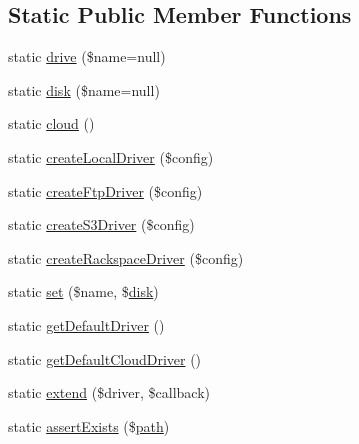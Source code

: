 \subsection*{Static Public Member Functions}
\begin{DoxyCompactItemize}
\item 
static \mbox{\hyperlink{class_illuminate_1_1_support_1_1_facades_1_1_storage_a261ec68d5325c6d133eac820d73a5a0d}{drive}} (\$name=null)
\item 
static \mbox{\hyperlink{class_illuminate_1_1_support_1_1_facades_1_1_storage_a6ae22fe200905058deeb0058c2a43d4d}{disk}} (\$name=null)
\item 
static \mbox{\hyperlink{class_illuminate_1_1_support_1_1_facades_1_1_storage_ae9be6c1f8f5a281ec97fc1ab69039ef6}{cloud}} ()
\item 
static \mbox{\hyperlink{class_illuminate_1_1_support_1_1_facades_1_1_storage_a496f26566f93d1f4072f222e0041a8a0}{create\+Local\+Driver}} (\$config)
\item 
static \mbox{\hyperlink{class_illuminate_1_1_support_1_1_facades_1_1_storage_aa08b823e86c1f3c25c78c337955cdbd7}{create\+Ftp\+Driver}} (\$config)
\item 
static \mbox{\hyperlink{class_illuminate_1_1_support_1_1_facades_1_1_storage_a1e32f6e2813cb377e6dee24d4d6cdb28}{create\+S3\+Driver}} (\$config)
\item 
static \mbox{\hyperlink{class_illuminate_1_1_support_1_1_facades_1_1_storage_ac64c2690d277dcc67da7f86181f2caae}{create\+Rackspace\+Driver}} (\$config)
\item 
static \mbox{\hyperlink{class_illuminate_1_1_support_1_1_facades_1_1_storage_ac28a1cac456a7fe97cb6209d6cd7cbc8}{set}} (\$name, \$\mbox{\hyperlink{class_illuminate_1_1_support_1_1_facades_1_1_storage_a6ae22fe200905058deeb0058c2a43d4d}{disk}})
\item 
static \mbox{\hyperlink{class_illuminate_1_1_support_1_1_facades_1_1_storage_ae9b8888977ed152ed426f366d448d1e4}{get\+Default\+Driver}} ()
\item 
static \mbox{\hyperlink{class_illuminate_1_1_support_1_1_facades_1_1_storage_a3c732a7b0b73807c1afeb2bdf1e344e3}{get\+Default\+Cloud\+Driver}} ()
\item 
static \mbox{\hyperlink{class_illuminate_1_1_support_1_1_facades_1_1_storage_a636805809864192142efc7db9e290358}{extend}} (\$driver, \$callback)
\item 
static \mbox{\hyperlink{class_illuminate_1_1_support_1_1_facades_1_1_storage_ab6574019c96c0987aa8e74c4d7aa987d}{assert\+Exists}} (\$\mbox{\hyperlink{class_illuminate_1_1_support_1_1_facades_1_1_storage_a7aaad06bbb92a00aa33ddbb19cd6a664}{path}})

\end{DoxyCompactItemize}
